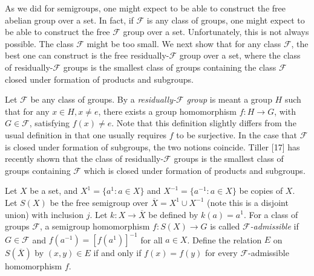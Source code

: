 \documentclass{article}
\begin{document}
As we did for semigroups, one might expect to be able to construct the free abelian group over a set. In fact, if $\mathcal{F}$ is any class of groups, one might expect to be able to construct the free $\mathcal{F}$ group over a set. Unfortunately, this is not always possible. The class $\mathcal{F}$ might be too small. We next show that for any class $\mathcal{F}$, the best one can construct is the free residually-$\mathcal{F}$ group over a set, where the class of residually-$\mathcal{F}$ groups is the smallest class of groups containing the class $\mathcal{F}$ closed under formation of products and subgroups.

Let $\mathcal{F}$ be any class of groups. By a \emph{residually-$\mathcal{F}$ group} is meant a group $H$ such that for any $x \in H, x \ne e$, there exists a group homomorphism $f: H \rightarrow G$, with $G \in \mathcal{F}$, satisfying $f(x) \ne e$. Note that this definition slightly differs from the usual definition in that one usually requires $f$ to be surjective. In the case that $\mathcal{F}$ is closed under formation of subgroups, the two notions coincide. Tiller [17] has recently shown that the class of residually-$\mathcal{F}$ groups is the smallest class of groups containing $\mathcal{F}$ which is closed under formation of products and subgroups.

Let $X$ be a set, and $X^1 = \{ a^1: a \in X \}$ and $X^{-1} = \{a^{-1}: a \in X\}$ be copies of $X$. Let $S(X)$ be the free semigroup over $\overline{X} = X^1 \cup X^{-1}$ (note this is a disjoint union) with inclusion $j$. Let $k: X \rightarrow \overline{X}$ be defined by $k(a) = a^1$. For a class of groups $\mathcal{F}$, a semigroup homomorphism $f: S(X) \rightarrow G$ is called \emph{$\mathcal{F}$-admissible} if $G \in \mathcal{F}$ and $f(a^{-1}) = [f(a^1)]^{-1}$ for all $a \in X$. Define the relation $E$ on $S(\overline{X})$ by $(x,y) \in E$ if and only if $f(x) = f(y)$ for every $\mathcal{F}$-admissible homomorphism $f$.
\end{document}
